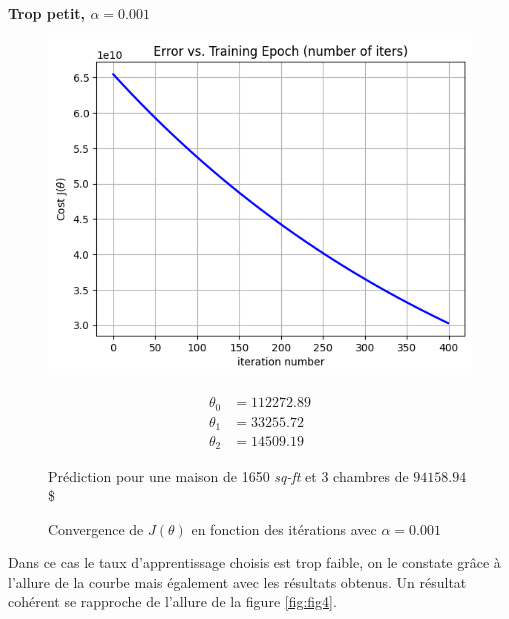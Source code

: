 \vspace{.5cm}
\noindent
\textbf{Trop petit, $\alpha = 0.001$}
\vspace{.2cm}

\begin{figure}[!h]
    \begin{minipage}{.48\linewidth}
        \begin{center}
            \includegraphics[width=1\textwidth]{./img/lowlearningrateng.png}
            \caption{\label{fig:fig5}Convergence de $J(\theta)$ en fonction des itérations avec $\alpha = 0.001$}  
        \end{center}
    \end{minipage}\hfill
    \begin{minipage}{.48\linewidth}
        \begin{equation*}
            \begin{aligned}
                \theta_0 &= 112272.89 \\
                \theta_1 &= 33255.72 \\
                \theta_2 &= 14509.19
            \end{aligned}
        \end{equation*}  

        Prédiction pour une maison de 1650 \textit{sq-ft} et 3 chambres de $94158.94$\$
    \end{minipage}
\end{figure}


Dans ce cas le taux d'apprentissage choisis est trop faible, on le constate grâce à l'allure de la courbe mais également avec les résultats obtenus. Un résultat cohérent se rapproche de l'allure de la figure \ref{fig:fig4}.

